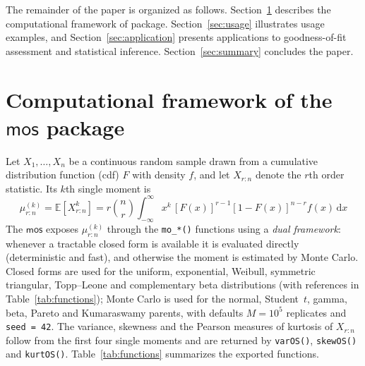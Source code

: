 \documentclass[twoside]{article}
\begin{document}
The remainder of the paper is organized as follows. Section~\ref{sec:design} describes the computational framework of package. Section~\ref{sec:usage} illustrates usage examples, and Section~\ref{sec:application} presents applications to goodness-of-fit assessment and statistical inference. Section~\ref{sec:summary} concludes the paper.
\section{Computational framework of the $\mathsf{mos}$ package}\label{sec:design}
Let $X_1,\ldots,X_n$ be a continuous random sample drawn from a cumulative distribution function (cdf) $F$ with density
$f$, and let $X_{r:n}$ denote the $r$th order statistic. Its $k$th single moment \citep{DavidNagaraja2003}
is
\begin{equation*}\label{eq:single-moment}
  \mu_{r:n}^{(k)} = \mathbb{E}\!\left[X_{r:n}^{k}\right]
  = r \binom{n}{r}\int_{-\infty}^{\infty} x^{k}\,[F(x)]^{r-1}[1-F(x)]^{n-r} f(x)\,\mathrm{d}x
\end{equation*}
The $\mathsf{mos}$ exposes
$\mu_{r:n}^{(k)}$ through the \texttt{mo\_*()} functions  using a \emph{dual framework}: whenever a tractable closed form is
available it is evaluated directly (deterministic and fast), and otherwise the
moment is estimated by Monte Carlo.
Closed forms are used for the uniform, exponential, Weibull, symmetric
triangular, Topp--Leone and complementary beta distributions (with references in
Table~\ref{tab:functions}); Monte Carlo is used for the normal, Student~$t$,
gamma, beta, Pareto and Kumaraswamy \citep{Kumaraswamy1980} parents, with defaults
$M=10^{5}$ replicates and \texttt{seed = 42}. The variance, skewness and the
Pearson measures of kurtosis of $X_{r:n}$ follow from the first four single
moments and are returned by
\texttt{varOS()}, \texttt{skewOS()} and \texttt{kurtOS()}. Table~\ref{tab:functions}
summarizes the exported functions.
\end{document}
